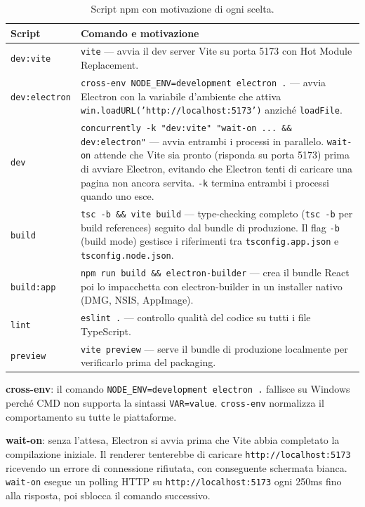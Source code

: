 \documentclass[a4paper,12pt]{article}
\begin{document}
\begin{table}[H]
\centering\small
\caption{Script npm con motivazione di ogni scelta.}
\begin{tabular}{L{3.5cm} L{8.5cm}}
\toprule
\textbf{Script} & \textbf{Comando e motivazione} \\
\midrule
\texttt{dev:vite} & \texttt{vite} --- avvia il dev server Vite su
  porta 5173 con Hot Module Replacement. \\[3pt]
\texttt{dev:electron} & \texttt{cross-env NODE\_\allowbreak{}ENV=development electron .}
  --- avvia Electron con la variabile d'ambiente che attiva
  \texttt{win.loadURL('http://localhost:5173')} anzich\'{e} \texttt{loadFile}. \\[3pt]
\texttt{dev} & \texttt{concurrently -k "dev:vite" "wait-on ... \&\& dev:electron"}
  --- avvia entrambi i processi in parallelo. \texttt{wait-on} attende
  che Vite sia pronto (risponda su porta 5173) prima di avviare Electron,
  evitando che Electron tenti di caricare una pagina non ancora servita.
  \texttt{-k} termina entrambi i processi quando uno esce. \\[3pt]
\texttt{build} & \texttt{tsc -b \&\& vite build} --- type-checking
  completo (\texttt{tsc -b} per build references) seguito dal bundle
  di produzione. Il flag \texttt{-b} (build mode) gestisce i riferimenti
  tra \texttt{tsconfig.app.json} e \texttt{tsconfig.node.json}. \\[3pt]
\texttt{build:app} & \texttt{npm run build \&\& electron-builder}
  --- crea il bundle React poi lo impacchetta con electron-builder
  in un installer nativo (DMG, NSIS, AppImage). \\[3pt]
\texttt{lint} & \texttt{eslint .} --- controllo qualit\`{a} del codice
  su tutti i file TypeScript. \\[3pt]
\texttt{preview} & \texttt{vite preview} --- serve il bundle di
  produzione localmente per verificarlo prima del packaging. \\
\bottomrule
\end{tabular}
\end{table}

\begin{infobox}
\textbf{cross-env}: il comando \texttt{NODE\_\allowbreak{}ENV=development electron .}
fallisce su Windows perch\'{e} CMD non supporta la sintassi
\texttt{VAR=value}. \texttt{cross-env} normalizza il comportamento su
tutte le piattaforme.

\textbf{wait-on}: senza l'attesa, Electron si avvia prima che Vite
abbia completato la compilazione iniziale. Il renderer tenterebbe di
caricare \texttt{http://localhost:5173} ricevendo un errore di
connessione rifiutata, con conseguente schermata bianca. \texttt{wait-on}
esegue un polling HTTP su \texttt{http://localhost:5173} ogni 250ms
fino alla risposta, poi sblocca il comando successivo.
\end{infobox}
\end{document}
